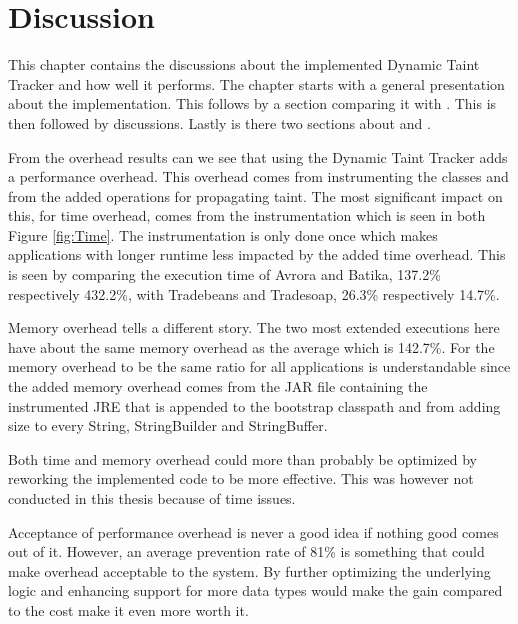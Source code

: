 \chapter{Discussion}
This chapter contains the discussions about the implemented Dynamic Taint Tracker and how well it performs. The chapter starts with a general presentation about the implementation. This follows by a section comparing it with \textit{}. This is then followed by \textit{} discussions. Lastly is there two sections about \textit{} and \textit{}.

From the overhead results can we see that using the Dynamic Taint Tracker adds a performance overhead. This overhead comes from instrumenting the classes and from the added operations for propagating taint. The most significant impact on this, for time overhead, comes from the instrumentation which is seen in both Figure \ref{fig:Time}. The instrumentation is only done once which makes applications with longer runtime less impacted by the added time overhead. This is seen by comparing the execution time of Avrora and Batika, 137.2\% respectively 432.2\%, with Tradebeans and Tradesoap, 26.3\% respectively 14.7\%.

Memory overhead tells a different story. The two most extended executions here have about the same memory overhead as the average which is 142.7\%. For the memory overhead to be the same ratio for all applications is understandable since the added memory overhead comes from the JAR file containing the instrumented JRE that is appended to the bootstrap classpath and from adding size to every String, StringBuilder and StringBuffer.

Both time and memory overhead could more than probably be optimized by reworking the implemented code to be more effective. This was however not conducted in this thesis because of time issues.

Acceptance of performance overhead is never a good idea if nothing good comes out of it. However, an average prevention rate of 81\% is something that could make overhead acceptable to the system. By further optimizing the underlying logic and enhancing support for more data types would make the gain compared to the cost make it even more worth it.



